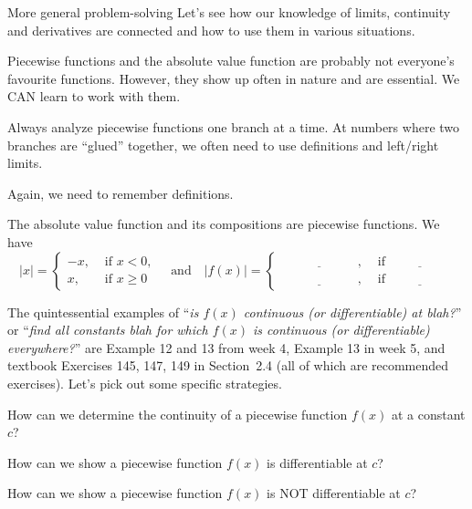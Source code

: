 \documentclass[../main.tex]{subfiles}
\begin{document}
\begin{lesson}{More general problem-solving}
  Let's see how our knowledge of limits, continuity and derivatives are connected and how to use them in various situations.

  \clearpage

  Piecewise functions and the absolute value function are probably not everyone's favourite functions. However, they show up often in nature and are essential. We CAN learn to work with them.

  \begin{mdframed}[style=simple-compact]
    Always analyze piecewise functions one branch at a time. At numbers where two branches are ``glued'' together, we often need to use definitions and left/right limits.

    Again, we need to remember definitions.
  \end{mdframed}

  The absolute value function and its compositions are piecewise functions. We have
  \[
    |x| = 
    \begin{cases}
      -x, &\text{ if } x < 0, \\
      x, &\text{ if } x \ge 0
    \end{cases}
    \quad \text{and} \quad 
    |f(x)| = 
    \begin{cases}
      \underline{\hspace{1in}}, &\text{ if } \underline{\hspace{2cm}} \\
      \underline{\hspace{1in}}, &\text{ if } \underline{\hspace{2cm}}
    \end{cases}
  \]

  The quintessential examples of ``\emph{is \(f(x)\) continuous (or differentiable) at blah?}'' or ``\emph{find all constants blah for which \(f(x)\) is continuous (or differentiable) everywhere?}'' are Example 12 and 13 from week 4, Example 13 in week 5, and textbook Exercises 145, 147, 149 in Section~2.4 (all of which are recommended exercises). Let's pick out some specific strategies.

  \faComment{} How can we determine the continuity of a piecewise function \(f(x)\) at a constant \(c\)?

  \faComment{} How can we show a piecewise function \(f(x)\) is differentiable at \(c\)?

  \faComment{} How can we show a piecewise function \(f(x)\) is NOT differentiable at \(c\)?
  \clearpage


\end{lesson}
\end{document}
